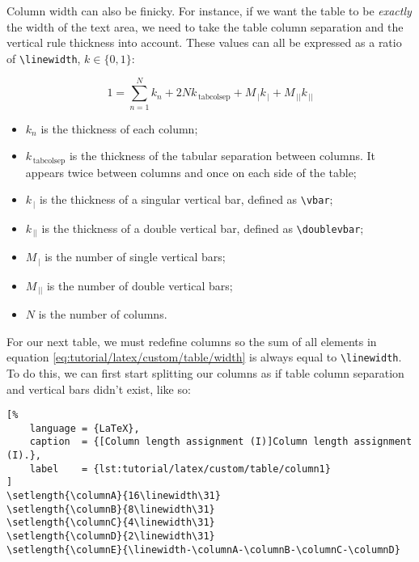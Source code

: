\endgroup

Column width can also be finicky. For instance, if we want the table to be \textit{exactly} the width of the text area, we need to take the table column separation and the vertical rule thickness into account. These \glspl{value} can all be expressed as a ratio of \texttt{\textbackslash{}linewidth}, $k\in\{0,1\}$:

\begin{equation}
    1 
        = \sum\limits_{n=1}^{N} k_n + 2Nk_{\,\text{tabcolsep}} + M_{\,|}k_{\,|} + M_{\,||}k_{\,||}
    \label{eq:tutorial/latex/custom/table/width}
\end{equation}

\begin{itemize}
    \item $k_n$ is the thickness of each column;
    \item $k_{\,\text{tabcolsep}}$ is the thickness of the tabular separation between columns. It appears twice between columns and once on each side of the table;
    \item $k_{\,|}$ is the thickness of a singular vertical bar, defined as \texttt{\textbackslash{}vbar};
    \item $k_{\,||}$ is the thickness of a double vertical bar, defined as \texttt{\textbackslash{}doublevbar};
    \item $M_{\,|}$ is the number of single vertical bars;
    \item $M_{\,||}$ is the number of double vertical bars;
    \item $N$ is the number of columns.
\end{itemize}

For our next table, we must redefine columns so the sum of all elements in equation \ref{eq:tutorial/latex/custom/table/width} is always equal to \texttt{\textbackslash{}linewidth}. To do this, we can first start splitting our columns as if table column separation and vertical bars didn't exist, like so:
\bigskip

\begin{lstlisting}[%
    language = {LaTeX},
    caption  = {[Column length assignment (I)]Column length assignment (I).},
    label    = {lst:tutorial/latex/custom/table/column1}
]
\setlength{\columnA}{16\linewidth\31}
\setlength{\columnB}{8\linewidth\31}
\setlength{\columnC}{4\linewidth\31}
\setlength{\columnD}{2\linewidth\31}
\setlength{\columnE}{\linewidth-\columnA-\columnB-\columnC-\columnD}
\end{lstlisting}

